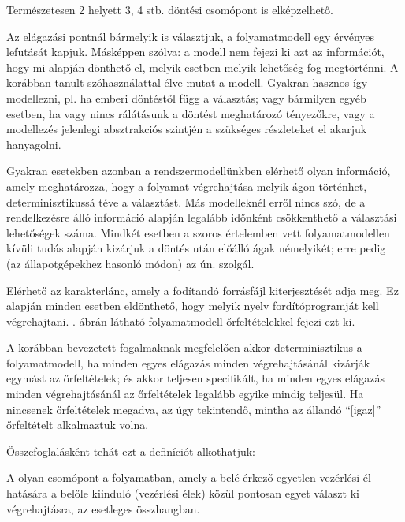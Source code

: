 Természetesen 2 helyett 3, 4 stb.  döntési csomópont is elképzelhető.

Az elágazási pontnál bármelyik  is választjuk, a folyamatmodell egy érvényes lefutását kapjuk. Másképpen szólva: a modell nem fejezi ki azt az információt, hogy mi alapján dönthető el, melyik esetben melyik lehetőség fog megtörténni. A korábban tanult szóhasználattal élve  mutat a modell. Gyakran hasznos így modellezni, pl. ha emberi döntéstől függ a választás; vagy bármilyen egyéb esetben, ha vagy nincs rálátásunk a döntést meghatározó tényezőkre, vagy a modellezés jelenlegi absztrakciós szintjén a szükséges részleteket el akarjuk hanyagolni. 

Gyakran esetekben azonban a rendszermodellünkben elérhető olyan információ, amely meghatározza, hogy a folyamat végrehajtása melyik ágon történhet, determinisztikussá téve a választást. Más modelleknél erről nincs szó, de a rendelkezésre álló információ alapján legalább időnként csökkenthető a választási lehetőségek száma. Mindkét esetben a szoros értelemben vett folyamatmodellen kívüli tudás alapján kizárjuk a döntés után előálló ágak némelyikét; erre pedig (az állapotgépekhez hasonló módon) az ún.  szolgál. 

\begin{pelda}
Elérhető az  karakterlánc, amely a fodítandó forrásfájl kiterjesztését adja meg. Ez alapján minden esetben eldönthető, hogy melyik nyelv fordítóprogramját kell végrehajtani. . ábrán látható folyamatmodell őrfeltételekkel fejezi ezt ki.
\end{pelda}


A korábban bevezetett fogalmaknak megfelelően akkor determinisztikus a folyamatmodell, ha minden egyes elágazás minden végrehajtásánál kizárják egymást az őrfeltételek; és akkor teljesen specifikált, ha minden egyes elágazás minden végrehajtásánál az őrfeltételek legalább egyike mindig teljesül. Ha nincsenek őrfeltételek megadva, az úgy tekintendő, mintha az állandó ``[igaz]'' őrfeltételt alkalmaztuk volna.

Összefoglalásként tehát ezt a definíciót alkothatjuk:

\begin{definicio}
	A  olyan csomópont a folyamatban, amely a belé érkező egyetlen vezérlési él hatására a belőle kiinduló  (vezérlési élek) közül pontosan egyet választ ki végrehajtásra, az esetleges  összhangban.
\end{definicio}


